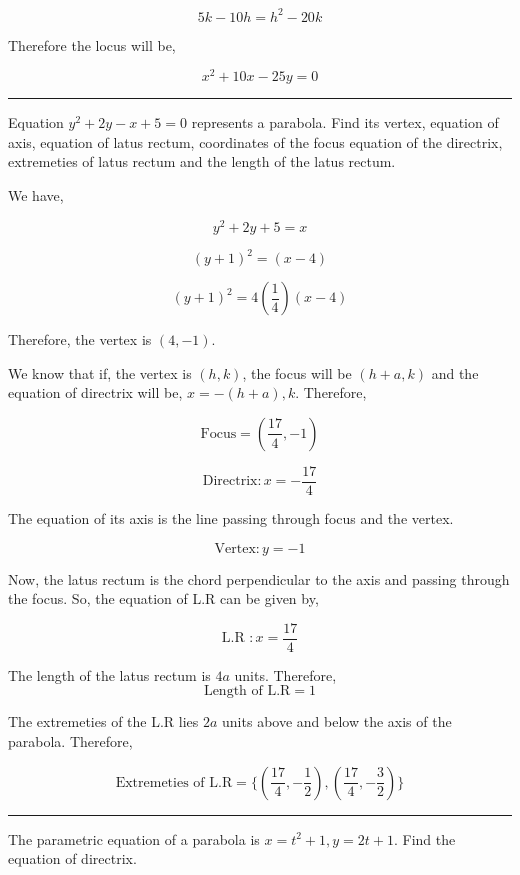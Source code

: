 \documentclass[twocolumn]{article}
\begin{document}
\[
    5k - 10h  = h^{2} - 20k
\]

Therefore the locus will be, 

\[
    \boxed{x^{2} + 10x - 25y = 0}
\]

\hrule 

\begin{question}
    Equation \(y^{2} + 2y - x + 5 = 0\)  represents a parabola. Find its vertex, equation of axis, equation of latus rectum, coordinates of the focus equation of the directrix, extremeties of latus rectum and the length of the latus rectum.  
\end{question}

We have, 

\[
    y^{2}  + 2y + 5 = x
\]

\[
    (y+  1)^{2} = (x-4)
\]

\[
    (y + 1)^{2} = 4 (\frac{1}{4}) (x-4)
\]

Therefore, the vertex is \(\boxed{(4, -1)}\). 

\vspace*{0.1in}

We know that if, the vertex is \((h, k)\), the focus will be \((h + a, k)\) and the equation of directrix will be, \(x = -(h+a), k\). Therefore, 

\[
    \text{Focus}  = \boxed{(\frac{17}{4}, -1)}
\]

\[
    \text{Directrix} : \boxed{x = -\frac{17}{4}}
\]

The equation of its axis is the line passing through focus and the vertex. 

\[
    \text{Vertex} : \boxed{y = -1}
\]

Now, the latus rectum is the chord perpendicular to the axis and passing through the focus. So, the equation of L.R can be given by, 

\[
    \text{L.R } : \boxed{x = \frac{17}{4}}
\]

The length of the latus rectum is \(4a\) units. Therefore, 
\[
    \boxed{\text{Length of L.R} = 1}
\]

The extremeties of the L.R lies \(2a\) units above and below the axis of the parabola. Therefore, 

\[
    \text{Extremeties of L.R} = \boxed{\{(\frac{17}{4}, -\frac{1}{2}), (\frac{17}{4}, -\frac{3}{2})\}}
\]

\hrule 

\begin{question}
    The parametric equation of a parabola is \(x  = t^{2} +1, y = 2t + 1\). Find the equation of directrix. 
\end{question}
\end{document}
